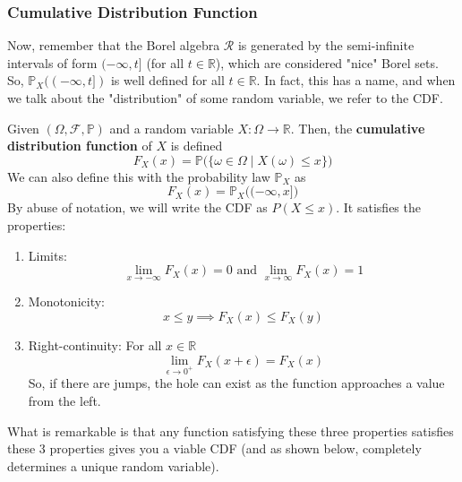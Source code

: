\documentclass{article}
\begin{document}
    \subsubsection{Cumulative Distribution Function}

      Now, remember that the Borel algebra $\mathcal{R}$ is generated by the semi-infinite intervals of form $(-\infty, t]$ (for all $t \in \mathbb{R}$), which are considered "nice" Borel sets. So, $\mathbb{P}_X( (-\infty, t])$ is well defined for all $t \in \mathbb{R}$. In fact, this has a name, and when we talk about the "distribution" of some random variable, we refer to the CDF. 

      \begin{definition}
        Given $(\Omega, \mathcal{F}, \mathbb{P})$ and a random variable $X: \Omega \rightarrow \mathbb{R}$. Then, the \textbf{cumulative distribution function} of $X$ is defined 
        \begin{equation}
          F_X (x) =\mathbb{P}\big( \{\omega \in \Omega \mid X(\omega) \leq x\} \big)
        \end{equation}
        We can also define this with the probability law $\mathbb{P}_X$ as 
        \begin{equation}
          F_X (x) = \mathbb{P}_X \big( (-\infty, x] \big)
        \end{equation}
        By abuse of notation, we will write the CDF as $P(X \leq x)$. It satisfies the properties: 
        \begin{enumerate}
          \item Limits: 
          \begin{equation}
            \lim_{x \rightarrow -\infty} F_X (x) = 0 \text{ and } \lim_{x \rightarrow \infty} F_X (x) = 1
          \end{equation}
          \item Monotonicity: 
          \begin{equation}
          x \leq y \implies F_X (x) \leq F_X (y)
          \end{equation}
          \item Right-continuity: For all $x \in \mathbb{R}$
          \begin{equation}
            \lim_{\epsilon \rightarrow 0^+} F_X (x + \epsilon) = F_X (x)
          \end{equation}
          So, if there are jumps, the hole can exist as the function approaches a value from the left. 
        \end{enumerate}
        What is remarkable is that any function satisfying these three properties satisfies these 3 properties gives you a viable CDF (and as shown below, completely determines a unique random variable). 
      \end{definition}
\end{document}
